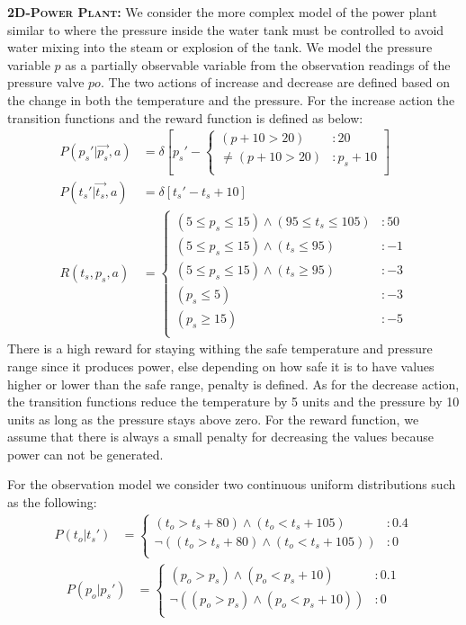 \documentclass{article} %
\begin{document}
{\bf \textsc{2D-Power Plant}:} We consider the more complex model of the power plant similar to \cite{steam2} where the pressure inside the water tank must be controlled to avoid water mixing into the steam or explosion of the tank. We model the pressure variable $p$ as a partially observable variable from the observation readings of the pressure valve $po$. The two actions of increase and decrease are defined based on the change in both the temperature and the pressure. For the increase action the transition functions and the reward function is defined as below: 
\begin{align}
P(p_s'|\vec{p_s},a)&= \delta\left[ p_s' - 
\begin{cases}
 (p+10> 20) &: 20 \\ 
\neq (p+10> 20) &: p_s + 10 \\
\end{cases}
\right]\nonumber
\\
P(t_s'|\vec{t_s},a)&= \delta\left[ t_s' -  t_s +10 \right]\nonumber
\\
R(t_s,p_s,a) &= 
\begin{cases}
(5 \leq p_s \leq 15)\wedge (95 \leq t_s \leq 105)&:50\\
(5 \leq p_s \leq 15)\wedge (t_s \leq 95)&: -1\\
(5 \leq p_s \leq 15)\wedge (t_s \geq 95)&: -3\\				
(p_s \leq 5) &: -3\\						
(p_s \geq 15) &: -5\\ 
\end{cases}\nonumber
\end{align}
There is a high reward for staying withing the safe temperature and pressure range since it produces power, else depending on how safe it is to have values higher or lower than the safe range, penalty is defined.
As for the decrease action, the transition functions reduce the temperature by 5 units and the pressure by 10 units as long as the pressure stays above zero. For the reward function, we assume that there is always a small penalty for decreasing the values because power can not be generated. 

For the observation model we consider two continuous uniform distributions such as the following:  
\begin{align}
P(t_o|t_s') &= 
\begin{cases}
 (t_o>t_s + 80) \wedge (t_o<t_s+ 105) &: 0.4 \\
 \neg( (t_o>t_s + 80) \wedge (t_o<t_s+ 105)) &: 0 \\
\end{cases}\nonumber
\end{align}
\begin{align}
P(p_o|p_s') &= 
\begin{cases}
 (p_o>p_s) \wedge (p_o<p_s+10) &: 0.1 \\
 \neg( (p_o>p_s) \wedge (p_o<p_s+10)) &: 0 \\
\end{cases}\nonumber
\end{align}
\end{document}
